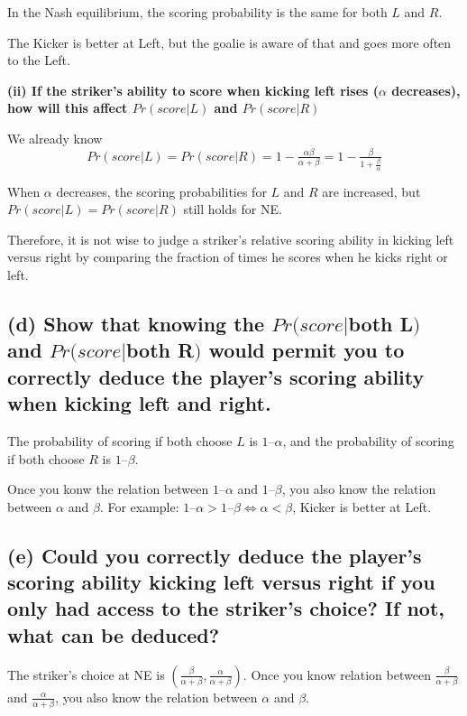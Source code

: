 \documentclass{article}
\begin{document}
In the Nash equilibrium, the scoring probability is the same for both $L$ and $R$.


\begin{mdframed}[backgroundcolor=blue!20,linecolor=white]
The Kicker is better at Left, but the goalie is aware of that and goes more often to the Left.

\end{mdframed}


\textbf{(ii) If the striker's ability to score when kicking left rises ($\alpha$ decreases), how will this affect $Pr(score|L)$ and $Pr(score|R)$}

\smallskip

We already know $$Pr(score|L) = Pr(score|R)= 1- \tfrac{\alpha \beta }{\alpha + \beta} =  1- \tfrac{\beta }{1 + \frac{\beta}{\alpha}}$$

When $\alpha$ decreases, the scoring probabilities for $L$ and $R$ are increased, but $Pr(score|L) = Pr(score|R)$ still holds for NE.

\medskip

Therefore, it is not wise to judge a striker's relative scoring ability in kicking left versus right by comparing the fraction of times he scores when he kicks right or left.


\subsection*{(d) Show that knowing the $Pr(score|$both L$)$ and $Pr(score|$both R$)$ would permit you to correctly deduce the player's scoring ability when kicking left and right.}

The probability of scoring if both choose $L$ is $1 – \alpha$, and the probability of scoring if both choose $R$ is $1 – \beta$. 


Once you konw the relation between $1 – \alpha$ and $1 – \beta$, you also know the relation between $\alpha$ and $\beta $. For example: $1 – \alpha > 1 – \beta \iff \alpha <  \beta $, Kicker is better at Left.


\subsection*{(e) Could you correctly deduce the player's scoring ability kicking left versus right if you only had access to the striker's choice? If not, what can be deduced?}

The striker's choice at NE is $(\tfrac{\beta}{\alpha + \beta},\tfrac{\alpha}{\alpha + \beta})$.
Once you know relation between $\tfrac{\beta}{\alpha + \beta}$ and $\tfrac{\alpha}{\alpha + \beta}$, you also know the relation between $\alpha$ and $\beta $.
\end{document}
